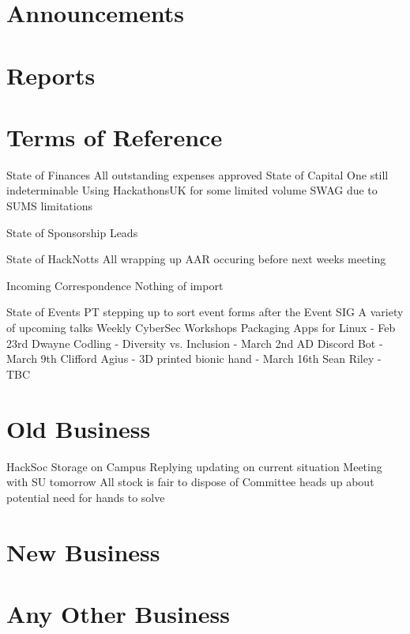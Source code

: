 \documentclass[11pt,hacksoc]{meetingmins}
\begin{document}
\maketitle

\section{Announcements}
\begin{items}
\item
\end{items}

\section{Reports}


\section{Terms of Reference}
\begin{items}
\item {State of Finances}
\subitem All outstanding expenses approved
\subitem State of Capital One still indeterminable
\subitem Using HackathonsUK for some limited volume SWAG due to SUMS limitations
\item {State of Sponsorship Leads}
\item {State of HackNotts}
\subitem All wrapping up
\subitem AAR occuring before next weeks meeting
\item {Incoming Correspondence}
\subitem Nothing of import
\item {State of Events}
\subitem PT stepping up to sort event forms after the Event SIG
\subitem A variety of upcoming talks
\subsubitem Weekly CyberSec Workshops
\subsubitem Packaging Apps for Linux - Feb 23rd
\subsubitem Dwayne Codling - Diversity vs. Inclusion - March 2nd
\subsubitem AD Discord Bot - March 9th
\subsubitem Clifford Agius - 3D printed bionic hand - March 16th
\subsubitem Sean Riley - TBC
\end{items}

\section{Old Business}
\begin{items}
\item HackSoc Storage on Campus
\subitem Replying updating on current situation
\subsubitem Meeting with SU tomorrow
\subsubitem All stock is fair to dispose of
\subitem Committee heads up about potential need for hands to solve
\end{items}

\section{New Business}

\section{Any Other Business}

\vspace{1em}
\nextmeeting{}
\end{document}
